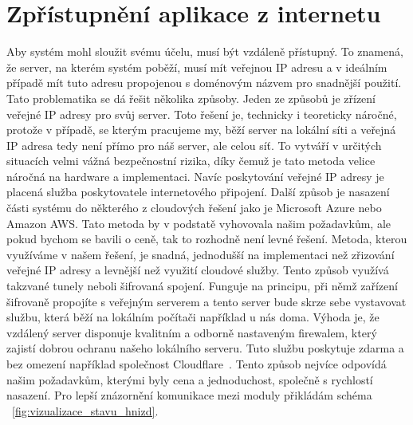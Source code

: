 \section{Zpřístupnění aplikace z internetu}\label{sec:zpristupneni-aplikace-z-internetu}
Aby systém mohl sloužit svému účelu, musí být vzdáleně přístupný.
To znamená, že server, na kterém systém poběží, musí mít veřejnou IP adresu a v ideálním případě mít tuto adresu propojenou s doménovým názvem pro snadnější použití.
Tato problematika se dá řešit několika způsoby.\newline
Jeden ze způsobů je zřízení veřejné IP adresy pro svůj server.
Toto řešení je, technicky i teoreticky náročné, protože v případě, se kterým pracujeme my, běží server na lokální síti a veřejná IP adresa tedy není přímo pro náš server, ale celou síť.
To vytváří v určitých situacích velmi vážná bezpečnostní rizika, díky čemuž je tato metoda velice náročná na hardware a implementaci.
Navíc poskytování veřejné IP adresy je placená služba poskytovatele internetového připojení.\newline
Další způsob je nasazení části systému do některého z cloudových řešení jako je Microsoft Azure nebo Amazon AWS.
Tato metoda by v podstatě vyhovovala našim požadavkům, ale pokud bychom se bavili o ceně, tak to rozhodně není levné řešení. \newline
Metoda, kterou využíváme v našem řešení, je snadná, jednodušší na implementaci než zřizování veřejné IP adresy a levnější než využití cloudové služby.
Tento způsob využívá takzvané tunely neboli šifrovaná spojení.
Funguje na principu, při němž zařízení šifrovaně propojíte s veřejným serverem a tento server bude skrze sebe vystavovat službu, která běží na lokálním počítači například u nás doma.
Výhoda je, že vzdálený server disponuje kvalitním a odborně nastaveným firewalem, který zajistí dobrou ochranu našeho lokálního serveru.
Tuto službu poskytuje zdarma a bez omezení například společnost Cloudflare~\cite{cloudflare}.
Tento způsob nejvíce odpovídá našim požadavkům, kterými byly cena a jednoduchost, společně s rychlostí nasazení.
Pro lepší znázornění komunikace mezi moduly přikládám schéma ~\ref{fig:vizualizace_stavu_hnizd}.

